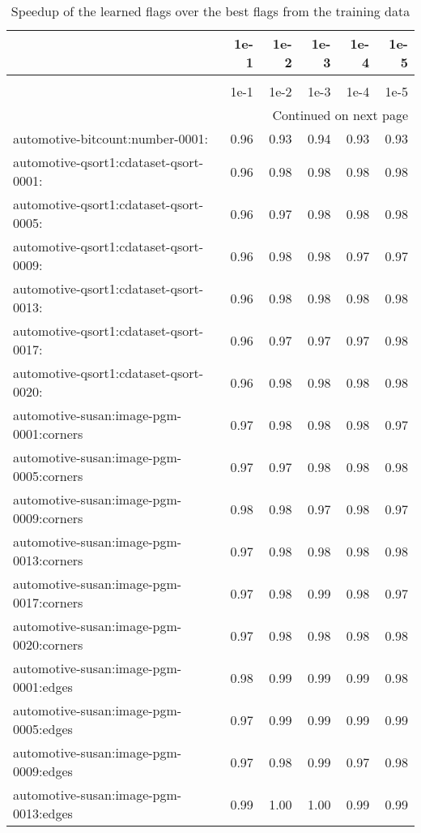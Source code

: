 \begin{longtable}{lrrrrr}
\caption{Speedup of the learned flags over the best flags from the training data} \label{table:validate_score_speedup} \\
\toprule
 & 1e-1 & 1e-2 & 1e-3 & 1e-4 & 1e-5 \\
\midrule
\endfirsthead
\caption[]{Speedup of the learned flags over the best flags from the training data} \\
\toprule
 & 1e-1 & 1e-2 & 1e-3 & 1e-4 & 1e-5 \\
\midrule
\endhead
\midrule
\multicolumn{6}{r}{Continued on next page} \\
\midrule
\endfoot
\bottomrule
\endlastfoot
automotive-bitcount:number-0001: & 0.96 & 0.93 & 0.94 & 0.93 & 0.93 \\
automotive-qsort1:cdataset-qsort-0001: & 0.96 & 0.98 & 0.98 & 0.98 & 0.98 \\
automotive-qsort1:cdataset-qsort-0005: & 0.96 & 0.97 & 0.98 & 0.98 & 0.98 \\
automotive-qsort1:cdataset-qsort-0009: & 0.96 & 0.98 & 0.98 & 0.97 & 0.97 \\
automotive-qsort1:cdataset-qsort-0013: & 0.96 & 0.98 & 0.98 & 0.98 & 0.98 \\
automotive-qsort1:cdataset-qsort-0017: & 0.96 & 0.97 & 0.97 & 0.97 & 0.98 \\
automotive-qsort1:cdataset-qsort-0020: & 0.96 & 0.98 & 0.98 & 0.98 & 0.98 \\
automotive-susan:image-pgm-0001:corners & 0.97 & 0.98 & 0.98 & 0.98 & 0.97 \\
automotive-susan:image-pgm-0005:corners & 0.97 & 0.97 & 0.98 & 0.98 & 0.98 \\
automotive-susan:image-pgm-0009:corners & 0.98 & 0.98 & 0.97 & 0.98 & 0.97 \\
automotive-susan:image-pgm-0013:corners & 0.97 & 0.98 & 0.98 & 0.98 & 0.98 \\
automotive-susan:image-pgm-0017:corners & 0.97 & 0.98 & 0.99 & 0.98 & 0.97 \\
automotive-susan:image-pgm-0020:corners & 0.97 & 0.98 & 0.98 & 0.98 & 0.98 \\
automotive-susan:image-pgm-0001:edges & 0.98 & 0.99 & 0.99 & 0.99 & 0.98 \\
automotive-susan:image-pgm-0005:edges & 0.97 & 0.99 & 0.99 & 0.99 & 0.99 \\
automotive-susan:image-pgm-0009:edges & 0.97 & 0.98 & 0.99 & 0.97 & 0.98 \\
automotive-susan:image-pgm-0013:edges & 0.99 & 1.00 & 1.00 & 0.99 & 0.99 \\

\end{longtable}
